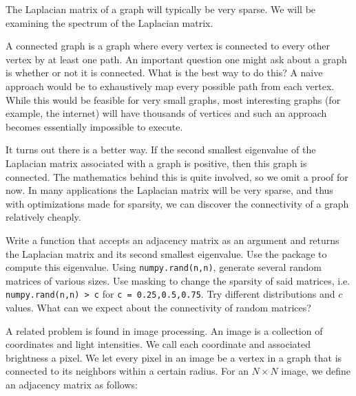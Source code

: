 The Laplacian matrix of a graph will typically be very sparse.
We will be examining the spectrum of the Laplacian matrix.

A connected graph is a graph where every vertex is connected to every other vertex by at least one path.
An important question one might ask about a graph is whether or not it is connected.
What is the best way to do this?
A naive approach would be to exhaustively map every possible path from each vertex.
While this would be feasible for very small graphs, most interesting graphs (for example, the internet) will have thousands of vertices and such an approach becomes essentially impossible to execute.

It turns out there is a better way.
If the second smallest eigenvalue of the Laplacian matrix associated with a graph is positive, then this graph is connected.
The mathematics behind this is quite involved, so we omit a proof for now.
In many applications the Laplacian matrix will be very sparse, and thus with optimizations made for sparsity, we can discover the connectivity of a graph relatively cheaply.

\begin{problem}Write a function  that accepts an adjacency matrix as an argument and returns the Laplacian matrix and its second smallest eigenvalue.
Use the  package to compute this eigenvalue.
Using {\tt numpy.rand(n,n)}, generate several random matrices of various sizes.
Use masking to change the sparsity of said matrices, i.e. {\tt numpy.rand(n,n) > c} for {\tt c = 0.25,0.5,0.75}.
Try different distributions and $c$ values.
What can we expect about the connectivity of random matrices?
\end{problem}

A related problem is found in image processing.
An image is a collection of coordinates and light intensities.
We call each coordinate and associated brightness a pixel.
We let every pixel in an image be a vertex in a graph that is connected to its neighbors within a certain radius.
For an $N \times N$ image, we define an adjacency matrix as follows:


